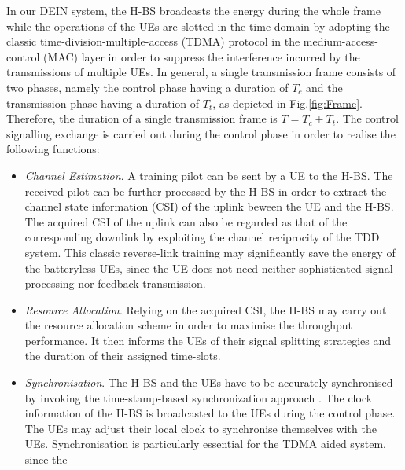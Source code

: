 \documentclass[12pt,draftcls,onecolumn,journal]{IEEEtran}
\begin{document}
In our DEIN system, the H-BS broadcasts the energy during the whole frame while the operations of the UEs are slotted in the time-domain by adopting the classic time-division-multiple-access (TDMA) protocol in the medium-access-control (MAC) layer in order to suppress the interference incurred by the transmissions of multiple UEs. In general, a single transmission frame consists of two phases, namely the control phase having a duration of $T_c$ and the transmission phase having a duration of $T_t$, as depicted in Fig.\ref{fig:Frame}. Therefore, the duration of a single transmission frame is $T=T_c+T_t$. The control signalling exchange is carried out during the control phase in order to realise the following functions:
\begin{itemize}
	\item \textit{Channel Estimation}. A training pilot can be sent by a UE to the H-BS. The received pilot can be further processed by the H-BS in order to extract the channel state information (CSI) of the uplink beween the UE and the H-BS. The acquired CSI of the uplink can also be regarded as that of the corresponding downlink by exploiting the channel reciprocity of the TDD system. This classic reverse-link training may significantly save the energy of the batteryless UEs, since the UE does not need neither sophisticated signal processing nor feedback transmission.
	\item \textit{Resource Allocation}. Relying on the acquired CSI, the H-BS may carry out the resource allocation scheme in order to maximise the throughput performance. It then informs the UEs of their signal splitting strategies and the duration of their assigned time-slots.
	\item \textit{Synchronisation}. The H-BS and the UEs have to be accurately synchronised by invoking the time-stamp-based synchronization approach \cite{7046389}. The clock information of the H-BS is broadcasted to the UEs during the control phase. The UEs may adjust their local clock to synchronise themselves with the UEs. Synchronisation is particularly essential for the TDMA aided system, since the
\end{itemize}
\end{document}
